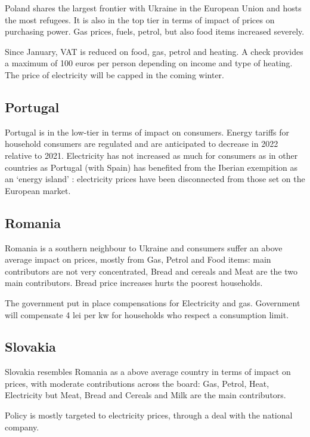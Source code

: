 \documentclass[
  9pt,
  a4paper,
  numbers=noendperiod,
  DIV=12]{scrartcl}
\begin{document}
Poland shares the largest frontier with Ukraine in the European Union
and hosts the most refugees. It is also in the top tier in terms of
impact of prices on purchasing power. Gas prices, fuels, petrol, but
also food items increased severely.

Since January, VAT is reduced on food, gas, petrol and heating. A check
provides a maximum of 100 euros per person depending on income and type
of heating. The price of electricity will be capped in the coming
winter.

\hypertarget{portugal}{%
\subsection{Portugal}\label{portugal}}

Portugal is in the low-tier in terms of impact on consumers. Energy
tariffs for household consumers are regulated and are anticipated to
decrease in 2022 relative to 2021. Electricity has not increased as much
for consumers as in other countries as Portugal (with Spain) has
benefited from the Iberian exempition as an `energy island' :
electricity prices have been disconnected from those set on the European
market.

\hypertarget{romania}{%
\subsection{Romania}\label{romania}}

Romania is a southern neighbour to Ukraine and consumers suffer an above
average impact on prices, mostly from Gas, Petrol and Food items: main
contributors are not very concentrated, Bread and cereals and Meat are
the two main contributors. Bread price increases hurts the poorest
households.

The government put in place compensations for Electricity and gas.
Government will compensate 4 lei per kw for households who respect a
consumption limit.

\hypertarget{slovakia}{%
\subsection{Slovakia}\label{slovakia}}

Slovakia resembles Romania as a above average country in terms of impact
on prices, with moderate contributions across the board: Gas, Petrol,
Heat, Electricity but Meat, Bread and Cereals and Milk are the main
contributors.

Policy is mostly targeted to electricity prices, through a deal with the
national company.
\end{document}
